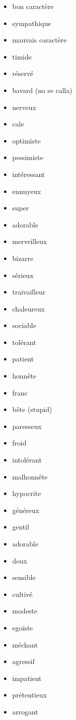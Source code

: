 \documentclass[palatino]{nicenotes}
\begin{document}
\begin{multicols}{3}
\begin{itemize}
\item bon caractère
\item sympathique
\item mauvais caractère
\item timide
\item réservé
\item bavard (no se calla)
\item nerveux
\item cale
\item optimiste
\item pessimiste
\item intéressant
\item ennuyeux
\item super
\item adorable
\item merveilleux
\item bizarre
\item sérieux
\item traivailleur
\item chaleureux
\item sociable
\item tolérant
\item patient
\item honn\^ete
\item franc
\item b\^ete (stupid)
\item paresseux
\item froid
\item intolérant
\item malhonn\^ete
\item hypocrite
\item généreux
\item gentil
\item adorable
\item doux
\item sensible
\item cultivé
\item modeste
\item egoïste
\item méchant
\item agressif
\item impatient
\item prétentieux
\item arrogant
\end{itemize}
\end{multicols}
\end{document}
